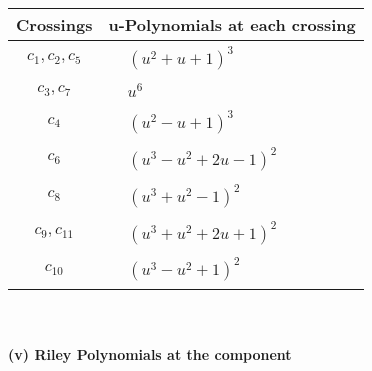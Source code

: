 \documentclass[1p]{elsarticle_modified}
\theoremstyle{definition}
\begin{document}
\begin{tabular}{m{50pt}|m{274pt}}
Crossings & \hspace{64pt}u-Polynomials at each crossing \\
\hline $$\begin{aligned}c_{1},c_{2},c_{5}\end{aligned}$$&$\begin{aligned}
&(u^2+u+1)^3
\end{aligned}$\\
\hline $$\begin{aligned}c_{3},c_{7}\end{aligned}$$&$\begin{aligned}
&u^6
\end{aligned}$\\
\hline $$\begin{aligned}c_{4}\end{aligned}$$&$\begin{aligned}
&(u^2- u+1)^3
\end{aligned}$\\
\hline $$\begin{aligned}c_{6}\end{aligned}$$&$\begin{aligned}
&(u^3- u^2+2 u-1)^2
\end{aligned}$\\
\hline $$\begin{aligned}c_{8}\end{aligned}$$&$\begin{aligned}
&(u^3+u^2-1)^2
\end{aligned}$\\
\hline $$\begin{aligned}c_{9},c_{11}\end{aligned}$$&$\begin{aligned}
&(u^3+u^2+2 u+1)^2
\end{aligned}$\\
\hline $$\begin{aligned}c_{10}\end{aligned}$$&$\begin{aligned}
&(u^3- u^2+1)^2
\end{aligned}$\\
\hline
\end{tabular}\\~\\
\newpage\renewcommand{\arraystretch}{1}
\flushleft \textbf{(v) Riley Polynomials at the component}\newline \\
\end{document}
